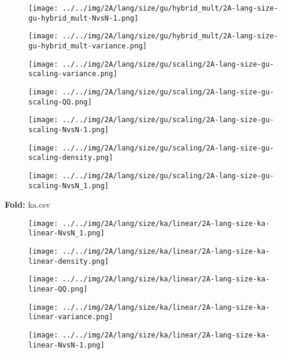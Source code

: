 \begin{figure}[H]
\centering	\texttt{[image: ../../img/2A/lang/size/gu/hybrid\_mult/2A-lang-size-gu-hybrid\_mult-NvsN-1.png]}
\end{figure}
\begin{figure}[H]
\centering	\texttt{[image: ../../img/2A/lang/size/gu/hybrid\_mult/2A-lang-size-gu-hybrid\_mult-variance.png]}
\end{figure}
\begin{figure}[H]
\centering	\texttt{[image: ../../img/2A/lang/size/gu/scaling/2A-lang-size-gu-scaling-variance.png]}
\end{figure}
\begin{figure}[H]
\centering	\texttt{[image: ../../img/2A/lang/size/gu/scaling/2A-lang-size-gu-scaling-QQ.png]}
\end{figure}
\begin{figure}[H]
\centering	\texttt{[image: ../../img/2A/lang/size/gu/scaling/2A-lang-size-gu-scaling-NvsN-1.png]}
\end{figure}
\begin{figure}[H]
\centering	\texttt{[image: ../../img/2A/lang/size/gu/scaling/2A-lang-size-gu-scaling-density.png]}
\end{figure}
\begin{figure}[H]
\centering	\texttt{[image: ../../img/2A/lang/size/gu/scaling/2A-lang-size-gu-scaling-NvsN\_1.png]}
\end{figure}
\textbf{Fold:} ka.csv
\begin{figure}[H]
\centering	\texttt{[image: ../../img/2A/lang/size/ka/linear/2A-lang-size-ka-linear-NvsN\_1.png]}
\end{figure}
\begin{figure}[H]
\centering	\texttt{[image: ../../img/2A/lang/size/ka/linear/2A-lang-size-ka-linear-density.png]}
\end{figure}
\begin{figure}[H]
\centering	\texttt{[image: ../../img/2A/lang/size/ka/linear/2A-lang-size-ka-linear-QQ.png]}
\end{figure}
\begin{figure}[H]
\centering	\texttt{[image: ../../img/2A/lang/size/ka/linear/2A-lang-size-ka-linear-variance.png]}
\end{figure}
\begin{figure}[H]
\centering	\texttt{[image: ../../img/2A/lang/size/ka/linear/2A-lang-size-ka-linear-NvsN-1.png]}
\end{figure}

